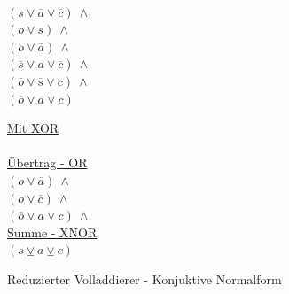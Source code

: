 \begin{figure}[!h]
\begin{minipage}[l]{3.5cm}
    ~\\
    $ (s \vee \overline{a} \vee \overline{c}) ~ \wedge $\\
    $ (o \vee s) ~ \wedge $\\
    $ (o \vee \overline{a}) ~ \wedge $\\
    $ (\overline{s} \vee a \vee \overline{c}) ~ \wedge $\\
    $ (\overline{o} \vee \overline{s} \vee c) ~ \wedge $\\
    $ (\overline{o} \vee a \vee c) $
  \end{minipage}
  \begin{minipage}[l]{3.5cm}
    \underline{Mit XOR}\\
    ~\\
    \underline{Übertrag - OR}\\
    $ (o \vee \overline{a}) ~ \wedge $\\
    $ (o \vee \overline{c}) ~ \wedge $\\
    $ (\overline{o} \vee a \vee c) ~ \wedge $\\
    \underline{Summe - XNOR}\\
    $ (s \veebar a \veebar c) $
  \end{minipage}
  \caption{Reduzierter Volladdierer - Konjuktive Normalform}
  \label{fig:red_fulladder_cnf}
\end{figure}

